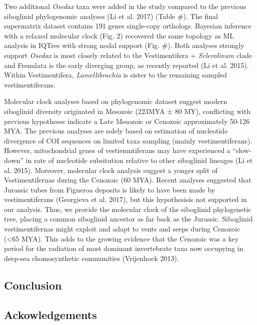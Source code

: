\documentclass[]{article}
\begin{document}
Two additional \emph{Osedax} taxa were added in the study compared to
the previous siboglinid phylogenomic analyses (Li et al. 2017) (Table
\#). The final supermatrix dataset contains 191 genes single-copy
orthologs. Bayesian inference with a relaxed molecular clock (Fig. 2)
recovered the same topology as ML analysis in IQTree with strong nodal
support (Fig. \#). Both analyses strongly support \emph{Osedax} is most
closely related to the Vestimentifera + \emph{Sclerolinum} clade and
Frenulata is the early diverging group, as recently reported (Li et al.
2015). Within Vestimentifera, \emph{Lamellibrachia} is sister to the
remaining sampled vestimentiferans.

Molecular clock analyses based on phylogenomic dataset suggest modern
siboglinid diversity originated in Mesozoic (223MYA ± 80 MY),
conflicting with previous hypotheses indicate a Late Mesozoic or
Cenozoic approximately 50-126 MYA. The previous analyses are solely
based on estimation of nucleotide divergence of COI sequences on limited
taxa sampling (mainly vestimentiferans). However, mitochondrial genes of
vestiemntiferans may have experienced a ``slow-down'' in rate of
nucleotide subsitution relative to other siboglinid lineages (Li et al.
2015). Moreover, molecular clock analysis suggest a yonger split of
Vestimentifernas during the Cenozoic (60 MYA). Recent analyses suggested
that Jurassic tubes from Figueroa deposits is likely to have been made
by vestimentiferans (Georgieva et al. 2017), but this hypothesisis not
supported in our analysis. Thus, we provide the molecular clock of the
siboglinid phylogenetic tree, placing a common siboglinid ancestor as
far back as the Jurassic. Siboglinid vestimentifernas might exploit and
adapt to vents and seeps during Cenozoic (\textless{}65 MYA). This adds
to the growing evidence that the Cenozoic was a key period for the
radiation of most dominant invertebrate taxa now occupying in deep-sea
chomosynthetic communities (Vrijenhoek 2013).

\hypertarget{conclusion}{%
\subsection{Conclusion}\label{conclusion}}

\hypertarget{ackowledgements}{%
\subsection{Ackowledgements}\label{ackowledgements}}
\end{document}
